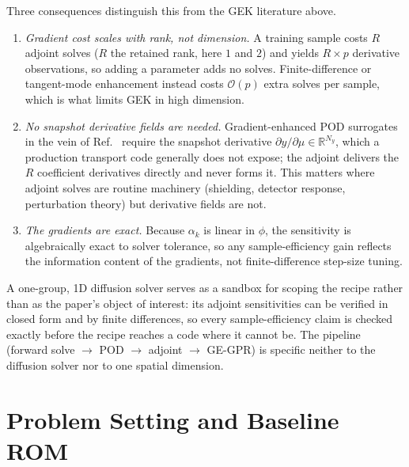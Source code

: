 \documentclass[]{ANStopical}
\begin{document}
Three consequences distinguish this from the GEK literature above.
\begin{enumerate}
    \item \emph{Gradient cost scales with rank, not dimension.} A training sample costs $R$ adjoint solves ($R$ the retained rank, here $1$ and $2$) and yields $R\times p$ derivative observations, so adding a parameter adds no solves. Finite-difference or tangent-mode enhancement instead costs $\mathcal{O}(p)$ extra solves per sample, which is what limits GEK in high dimension.
    \item \emph{No snapshot derivative fields are needed.} Gradient-enhanced POD surrogates in the vein of Ref.~\cite{zimmermann_pod_gek} require the snapshot derivative $\partial y/\partial\mu\in\mathbb{R}^{N_y}$, which a production transport code generally does not expose; the adjoint delivers the $R$ coefficient derivatives directly and never forms it. This matters where adjoint solves are routine machinery (shielding, detector response, perturbation theory) but derivative fields are not.
    \item \emph{The gradients are exact.} Because $\alpha_k$ is linear in $\phi$, the sensitivity is algebraically exact to solver tolerance, so any sample-efficiency gain reflects the information content of the gradients, not finite-difference step-size tuning.
\end{enumerate}

A one-group, 1D diffusion solver serves as a sandbox for scoping the recipe rather than as the paper's object of interest: its adjoint sensitivities can be verified in closed form and by finite differences, so every sample-efficiency claim is checked exactly before the recipe reaches a code where it cannot be. The pipeline (forward solve $\rightarrow$ POD $\rightarrow$ adjoint $\rightarrow$ GE-GPR) is specific neither to the diffusion solver nor to one spatial dimension.


\section{Problem Setting and Baseline ROM}\label{sec:fwd}
\end{document}
